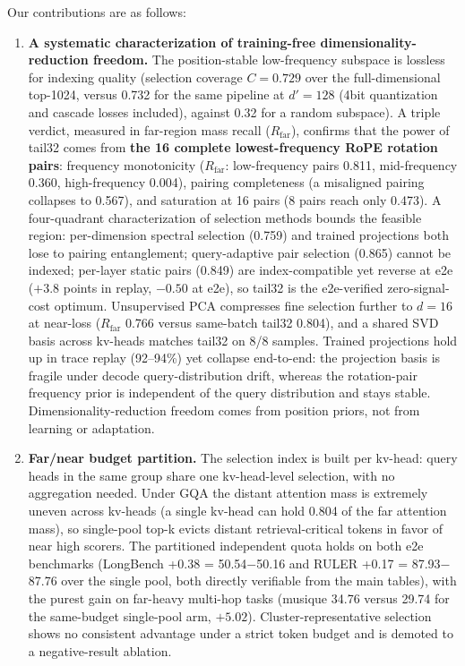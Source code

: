 \documentclass[11pt]{article}
\begin{document}
Our contributions are as follows:
\begin{enumerate}
\item \textbf{A systematic characterization of training-free dimensionality-reduction freedom.} The position-stable low-frequency subspace is lossless for indexing quality (selection coverage $C{=}0.729$ over the full-dimensional top-1024, versus 0.732 for the same pipeline at $d'{=}128$ (4bit quantization and cascade losses included), against 0.32 for a random subspace). A triple verdict, measured in far-region mass recall ($R_{\mathrm{far}}$), confirms that the power of tail32 comes from \textbf{the 16 complete lowest-frequency RoPE rotation pairs}: frequency monotonicity ($R_{\mathrm{far}}$: low-frequency pairs 0.811, mid-frequency 0.360, high-frequency 0.004), pairing completeness (a misaligned pairing collapses to 0.567), and saturation at 16 pairs (8 pairs reach only 0.473). A four-quadrant characterization of selection methods bounds the feasible region: per-dimension spectral selection (0.759) and trained projections both lose to pairing entanglement; query-adaptive pair selection (0.865) cannot be indexed; per-layer static pairs (0.849) are index-compatible yet reverse at e2e ($+3.8$ points in replay, $-0.50$ at e2e), so tail32 is the e2e-verified zero-signal-cost optimum. Unsupervised PCA compresses fine selection further to $d{=}16$ at near-loss ($R_{\mathrm{far}}$ 0.766 versus same-batch tail32 0.804), and a shared SVD basis across kv-heads matches tail32 on 8/8 samples. Trained projections hold up in trace replay (92--94\%) yet collapse end-to-end: the projection basis is fragile under decode query-distribution drift, whereas the rotation-pair frequency prior is independent of the query distribution and stays stable. Dimensionality-reduction freedom comes from position priors, not from learning or adaptation.
\item \textbf{Far/near budget partition.} The selection index is built per kv-head: query heads in the same group share one kv-head-level selection, with no aggregation needed. Under GQA the distant attention mass is extremely uneven across kv-heads (a single kv-head can hold 0.804 of the far attention mass), so single-pool top-k evicts distant retrieval-critical tokens in favor of near high scorers. The partitioned independent quota holds on both e2e benchmarks (LongBench +0.38 = 50.54$-$50.16 and RULER +0.17 = 87.93$-$87.76 over the single pool, both directly verifiable from the main tables), with the purest gain on far-heavy multi-hop tasks (musique 34.76 versus 29.74 for the same-budget single-pool arm, $+5.02$). Cluster-representative selection shows no consistent advantage under a strict token budget and is demoted to a negative-result ablation.

\end{enumerate}
\end{document}
